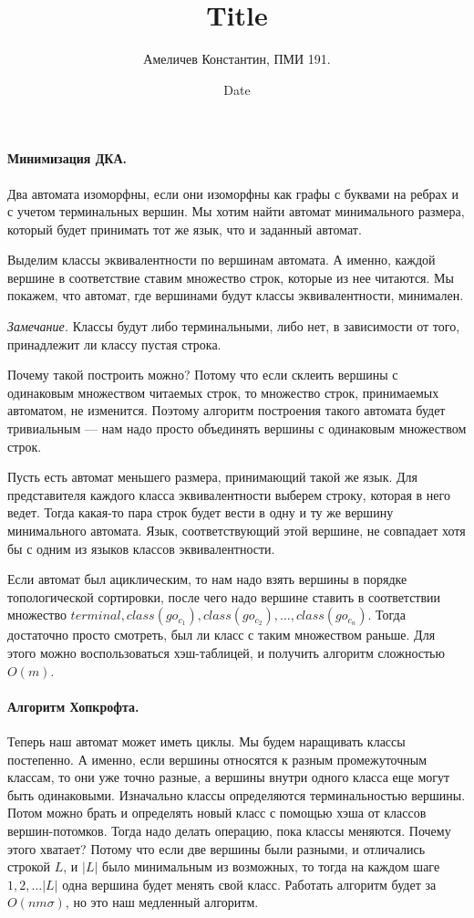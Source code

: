 \documentclass[12pt]{article}
\title{Title}
\author{Амеличев Константин, ПМИ 191.}
\date{Date}
\begin{document}
\paragraph{Минимизация ДКА.} Два автомата изоморфны, если они изоморфны как графы с буквами на ребрах и с учетом терминальных вершин. Мы хотим найти автомат минимального размера, который будет принимать тот же язык, что и заданный автомат. 

Выделим классы эквивалентности по вершинам автомата. А именно, каждой вершине в соответствие ставим множество строк, которые из нее читаются. Мы покажем, что автомат, где вершинами будут классы эквивалентности, минимален.

\textit{Замечание.} Классы будут либо терминальными, либо нет, в зависимости от того, принадлежит ли классу пустая строка.

Почему такой построить можно? Потому что если склеить вершины с одинаковым множеством читаемых строк, то множество строк, принимаемых автоматом, не изменится. Поэтому алгоритм построения такого автомата будет тривиальным --- нам надо просто объединять вершины с одинаковым множеством строк.

Пусть есть автомат меньшего размера, принимающий такой же язык. Для представителя каждого класса эквивалентности выберем строку, которая в него ведет. Тогда какая-то пара строк будет вести в одну и ту же вершину минимального автомата. Язык, соответствующий этой вершине, не совпадает хотя бы с одним из языков классов эквивалентности.

Если автомат был ациклическим, то нам надо взять вершины в порядке топологической сортировки, после чего надо вершине ставить в соответствии множество $terminal, class(go_{c_1}), class(go_{c_2}), \ldots, class(go_{c_n})$. Тогда достаточно просто смотреть, был ли класс с таким множеством раньше. Для этого можно воспользоваться хэш-таблицей, и получить алгоритм сложностью $O(m)$.

\paragraph{Алгоритм Хопкрофта.} Теперь наш автомат может иметь циклы. Мы будем наращивать классы постепенно. А именно, если вершины относятся к разным промежуточным классам, то они уже точно разные, а вершины внутри одного класса еще могут быть одинаковыми. Изначально классы определяются терминальностью вершины. Потом можно брать и определять новый класс с помощью хэша от классов вершин-потомков. Тогда надо делать операцию, пока классы меняются. Почему этого хватает? Потому что если две вершины были разными, и отличались строкой $L$, и $|L|$ было минимальным из возможных, то тогда на каждом шаге $1, 2, \ldots |L|$ одна вершина будет менять свой класс. Работать алгоритм будет за $O(nm \sigma)$, но это наш медленный алгоритм.
\end{document}
